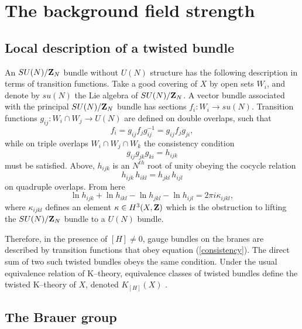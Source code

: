 \documentclass[a4paper,a4paper]{article}
\begin{document}
\section{The background field strength}\label{background}  

\subsection{Local description of a twisted bundle}\label{local}  
  
An $SU(N)/{\bf Z}_N$ bundle without $U(N)$ structure has the following  
description in terms of transition functions. Take a good covering of $X$   
by open sets $W_i$, and denote by $su(N)$ the Lie algebra of $SU(N)/{\bf Z}_N$. 
A vector bundle associated with the principal $SU(N)/{\bf Z}_N$ bundle has sections 
$f_i:W_i\rightarrow su(N)$. Transition functions $g_{ij}:W_i\cap W_j\rightarrow U(N)$ 
are defined on double overlaps, such that   
\begin{equation}  
f_i=g_{ij}f_jg_{ij}^{-1}=g_{ij}f_jg_{ji},  
\label{trans}
\end{equation}  
while on triple overlaps $W_i\cap W_j\cap W_k$ the consistency condition  
\begin{equation}  
g_{ij}g_{jk}g_{ki}=h_{ijk}  
\label{consistency}
\end{equation}  
must be satisfied. Above, $h_{ijk}$ is an $N^{th}$ root of unity 
obeying the cocycle relation  
\begin{equation}  
h_{ijk}\,h_{ikl}=h_{jkl}\,h_{ijl}  
\label{cocyclei}
\end{equation}  
on quadruple overlaps. From here  
\begin{equation}  
\ln h_{ijk} + \ln h_{ikl} - \ln h_{jkl} - \ln h_{ijl}   
=2\pi i \kappa_{ijkl},  
\label{kappa}
\end{equation}  
where $\kappa_{ijkl}$ defines an element $\kappa\in H^3(X,{\bf Z})$ 
which is the obstruction to lifting the $SU(N)/{\bf Z}_N$ bundle to  
a $U(N)$ bundle.   
  
Therefore, in the presence of $[H]\neq 0$, gauge bundles on the  
branes are described by transition functions that obey  
equation (\ref{consistency}). The direct sum of two such twisted bundles 
obeys the same condition. Under the usual equivalence relation of K--theory, 
equivalence classes of twisted bundles define the twisted K--theory of $X$, 
denoted $K_{[H]}(X)$ \cite{WITTENDK}.  

\subsection{The Brauer group}\label{bru}
\end{document}
